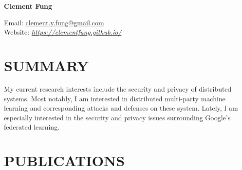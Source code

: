 \documentclass[10pt]{res} %
\begin{document}
{\huge \bf Clement Fung} \hfill 

Email: \href{mailto:clement.y.fung@gmail.com}{\underline{clement.y.fung@gmail.com}} \\ 
Website: \href{https://clementfung.github.io/}{\emph{https://clementfung.github.io/}} \\


\section{SUMMARY}

\vspace{0.2in} %

My current research interests include the security and privacy of distributed systems. Most notably, I am interested in distributed multi-party machine learning and corresponding attacks and defenses on these system. Lately, I am especially interested in the security and privacy issues surrounding Google's federated learning.


\section{PUBLICATIONS}
\end{document}
